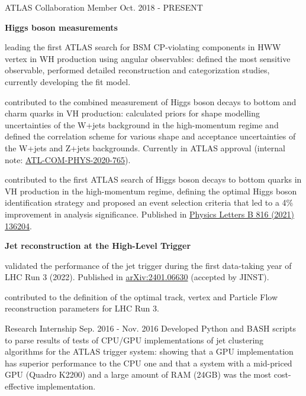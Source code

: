 \begin{cventries}
    \cventry
    {ATLAS Collaboration}
    {Member}
    {}
    {Oct. 2018 - PRESENT}
    {
        \textbf{Higgs boson measurements}\vspace{14pt}
        \begin{cvitems}
            \item {leading the first ATLAS search for BSM CP-violating components in HWW vertex in WH production using angular observables: defined the most sensitive observable, performed detailed reconstruction and categorization studies, currently developing the fit model.}
            \item {contributed to the combined measurement of Higgs boson decays to bottom and charm quarks in VH production: calculated priors for shape modelling uncertainties of the W+jets background in the high-momentum regime and defined the correlation scheme for various shape and acceptance uncertainties of the W+jets and Z+jets backgrounds. Currently in ATLAS approval (internal note: \href{https://cds.cern.ch/record/2743096}{ATL-COM-PHYS-2020-765}).}
            \item {contributed to the first ATLAS search of Higgs boson decays to bottom quarks in VH production in the high-momentum regime, defining the optimal Higgs boson identification strategy and proposed an event selection criteria that led to a 4\% improvement in analysis significance. Published in \href{https://doi.org/10.1016/j.physletb.2021.136204}{Physics Letters B 816 (2021) 136204}.}
        \end{cvitems}\vspace{19pt}
        \textbf{Jet reconstruction at the High-Level Trigger}\vspace{14pt}
        \begin{cvitems}
            \item {validated the performance of the jet trigger during the first data-taking year of LHC Run 3 (2022). Published in \href{https://doi.org/10.48550/arXiv.2401.06630}{arXiv:2401.06630} (accepted by JINST).}
            \item {contributed to the definition of the optimal track, vertex and Particle Flow reconstruction parameters for LHC Run 3.}
        \end{cvitems}
    }

    {Research Internship}
    {}
    {Sep. 2016 - Nov. 2016}
    {Developed Python and BASH scripts to parse results of tests of CPU/GPU implementations of jet clustering algorithms for the ATLAS trigger system: showing that a GPU implementation has superior performance to the CPU one and that a system with a mid-priced GPU (Quadro K2200) and a large amount of RAM (24GB) was the most cost-effective implementation.}


\end{cventries}
